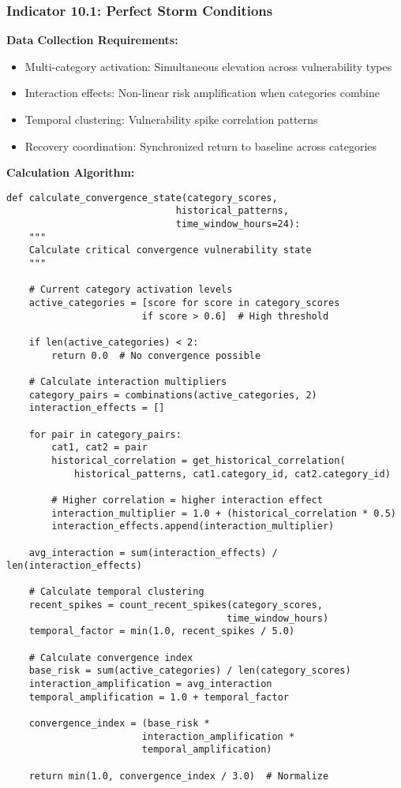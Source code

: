 \documentclass[10pt,twocolumn]{IEEEtran}
\begin{document}
\subsubsection{Indicator 10.1: Perfect Storm Conditions}

\textbf{Data Collection Requirements:}
\begin{itemize}
\item Multi-category activation: Simultaneous elevation across vulnerability types
\item Interaction effects: Non-linear risk amplification when categories combine
\item Temporal clustering: Vulnerability spike correlation patterns
\item Recovery coordination: Synchronized return to baseline across categories
\end{itemize}

\textbf{Calculation Algorithm:}
\begin{lstlisting}[caption={Convergence State Detection}]
def calculate_convergence_state(category_scores, 
                              historical_patterns,
                              time_window_hours=24):
    """
    Calculate critical convergence vulnerability state
    """
    
    # Current category activation levels
    active_categories = [score for score in category_scores 
                        if score > 0.6]  # High threshold
    
    if len(active_categories) < 2:
        return 0.0  # No convergence possible
    
    # Calculate interaction multipliers
    category_pairs = combinations(active_categories, 2)
    interaction_effects = []
    
    for pair in category_pairs:
        cat1, cat2 = pair
        historical_correlation = get_historical_correlation(
            historical_patterns, cat1.category_id, cat2.category_id)
        
        # Higher correlation = higher interaction effect
        interaction_multiplier = 1.0 + (historical_correlation * 0.5)
        interaction_effects.append(interaction_multiplier)
    
    avg_interaction = sum(interaction_effects) / len(interaction_effects)
    
    # Calculate temporal clustering
    recent_spikes = count_recent_spikes(category_scores, 
                                       time_window_hours)
    temporal_factor = min(1.0, recent_spikes / 5.0)
    
    # Calculate convergence index
    base_risk = sum(active_categories) / len(category_scores)
    interaction_amplification = avg_interaction
    temporal_amplification = 1.0 + temporal_factor
    
    convergence_index = (base_risk * 
                        interaction_amplification * 
                        temporal_amplification)
    
    return min(1.0, convergence_index / 3.0)  # Normalize
\end{lstlisting}
\end{document}
